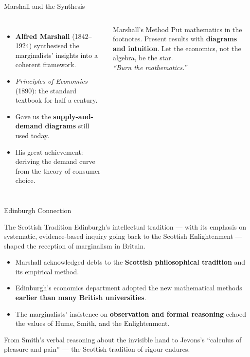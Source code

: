 \documentclass[aspectratio=169, 10pt]{beamer}
\begin{document}
\begin{frame}{Marshall and the Synthesis}
\begin{columns}[T]
\begin{itemize}
  \item \textbf{Alfred Marshall} (1842--1924) synthesised the marginalists'
        insights into a coherent framework.
  \item \textit{Principles of Economics} (1890): the standard textbook
        for half a century.
  \item Gave us the \textbf{supply-and-demand diagrams} still used today.
  \item His great achievement: deriving the \alert{demand curve}
        from the theory of consumer choice.
\end{itemize}
\begin{block}{Marshall's Method}
Put mathematics in the footnotes. Present results with
\textbf{diagrams and intuition}. Let the economics, not the
algebra, be the star.\\[6pt]
\textit{``Burn the mathematics.''}
\end{block}
\end{columns}
\end{frame}

\begin{frame}{Edinburgh Connection}
\begin{block}{The Scottish Tradition}
Edinburgh's intellectual tradition --- with its emphasis on systematic,
evidence-based inquiry going back to the Scottish Enlightenment ---
shaped the reception of marginalism in Britain.
\end{block}
\vspace{0.5em}
\begin{itemize}
  \item Marshall acknowledged debts to the \textbf{Scottish philosophical
        tradition} and its empirical method.
  \item Edinburgh's economics department adopted the new mathematical
        methods \textbf{earlier than many British universities}.
  \item The marginalists' insistence on \textbf{observation and formal reasoning}
        echoed the values of Hume, Smith, and the Enlightenment.
\end{itemize}
\vspace{0.5em}
From Smith's verbal reasoning about the invisible hand to Jevons's
``calculus of pleasure and pain'' --- the Scottish tradition of rigour
endures.
\end{frame}
\end{document}
